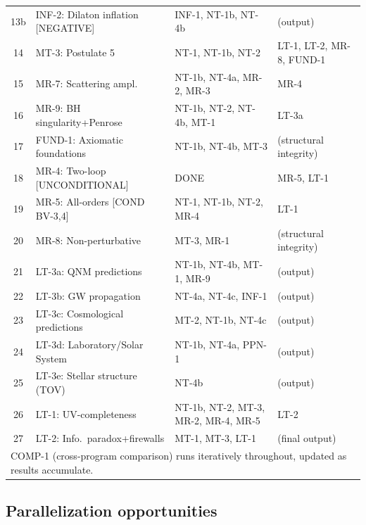 \documentclass[12pt,a4paper]{article}
\begin{document}
\begin{longtable}{clp{3.2cm}p{4.5cm}}
13b & \textcolor{long}{INF-2: Dilaton inflation [NEGATIVE]} & INF-1, NT-1b, NT-4b & (output) \\
14 & MT-3: Postulate 5 & NT-1, NT-1b, NT-2 & LT-1, LT-2, MR-8, FUND-1 \\
15 & MR-7: Scattering ampl. & NT-1b, NT-4a, MR-2, MR-3 & MR-4 \\
16 & MR-9: BH singularity+Penrose & NT-1b, NT-2, NT-4b, MT-1 & LT-3a \\
17 & FUND-1: Axiomatic foundations & NT-1b, NT-4b, MT-3 & (structural integrity) \\
18 & \textcolor{proven}{MR-4: Two-loop [UNCONDITIONAL]} & \textcolor{proven}{DONE} & MR-5, LT-1 \\
19 & \textcolor{near}{MR-5: All-orders [COND BV-3,4]} & NT-1, NT-1b, NT-2, MR-4 & LT-1 \\
20 & MR-8: Non-perturbative & MT-3, MR-1 & (structural integrity) \\
21 & LT-3a: QNM predictions & NT-1b, NT-4b, MT-1, MR-9 & (output) \\
22 & LT-3b: GW propagation & NT-4a, NT-4c, INF-1 & (output) \\
23 & LT-3c: Cosmological predictions & MT-2, NT-1b, NT-4c & (output) \\
24 & LT-3d: Laboratory/Solar System & NT-1b, NT-4a, PPN-1 & (output) \\
25 & LT-3e: Stellar structure (TOV) & NT-4b & (output) \\
26 & LT-1: UV-completeness & NT-1b, NT-2, MT-3, MR-2, MR-4, MR-5 & LT-2 \\
27 & LT-2: Info.\ paradox+firewalls & MT-1, MT-3, LT-1 & (final output) \\
\midrule
\multicolumn{4}{l}{\footnotesize COMP-1 (cross-program comparison) runs iteratively throughout, updated as results accumulate.} \\
\bottomrule
\end{longtable}

\subsection{Parallelization opportunities}
\end{document}
